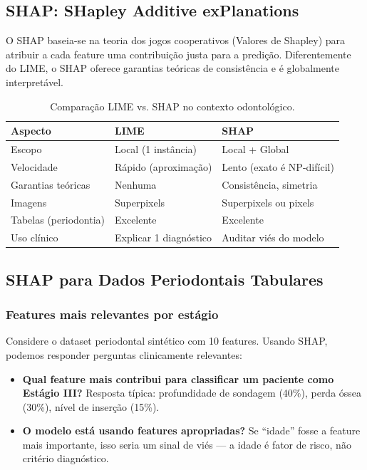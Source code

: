 \subsection{SHAP: SHapley Additive exPlanations}

O SHAP \cite{lundberg2017shap} baseia-se na teoria dos jogos cooperativos
(Valores de Shapley) para atribuir a cada feature uma contribuição justa
para a predição. Diferentemente do LIME, o SHAP oferece garantias teóricas
de consistência e é globalmente interpretável.

\begin{table}[H]
  \centering
  \caption{Comparação LIME vs. SHAP no contexto odontológico.}
  \label{tab:lime-shap}
  \begin{tabularx}{\textwidth}{lXX}
    \toprule
    \textbf{Aspecto} & \textbf{LIME} & \textbf{SHAP} \\
    \midrule
    Escopo & Local (1 instância) & Local + Global \\
    Velocidade & Rápido (aproximação) & Lento (exato é NP-difícil) \\
    Garantias teóricas & Nenhuma & Consistência, simetria \\
    Imagens & Superpixels & Superpixels ou pixels \\
    Tabelas (periodontia) & Excelente & Excelente \\
    Uso clínico & Explicar 1 diagnóstico & Auditar viés do modelo \\
    \bottomrule
  \end{tabularx}
\end{table}

\subsection{SHAP para Dados Periodontais Tabulares}

\subsubsection{Features mais relevantes por estágio}

Considere o dataset periodontal sintético com 10 features. Usando SHAP,
podemos responder perguntas clinicamente relevantes:

\begin{itemize}
  \item \textbf{Qual feature mais contribui para classificar um paciente
    como Estágio III?} Resposta típica: profundidade de sondagem (40\%),
    perda óssea (30\%), nível de inserção (15\%).
  \item \textbf{O modelo está usando features apropriadas?} Se ``idade''
    fosse a feature mais importante, isso seria um sinal de viés — a idade
    é fator de risco, não critério diagnóstico.
\end{itemize}

